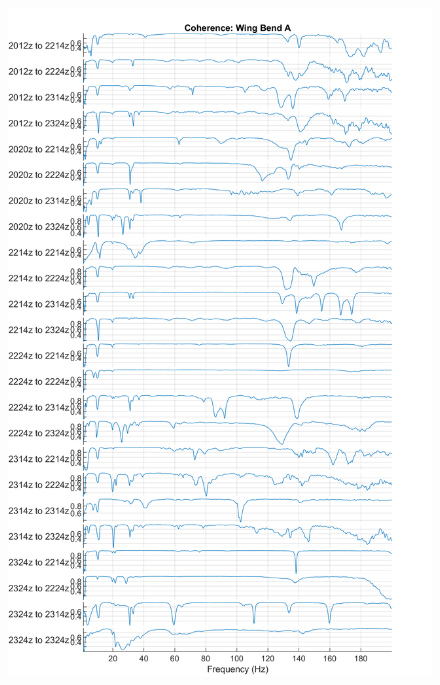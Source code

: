 \begin{figure}[H]
    \centering
    \includegraphics{figs/GVT/coh_Wing Bend A.png}
    \label{fig:coh_wingBendA}
\end{figure}

